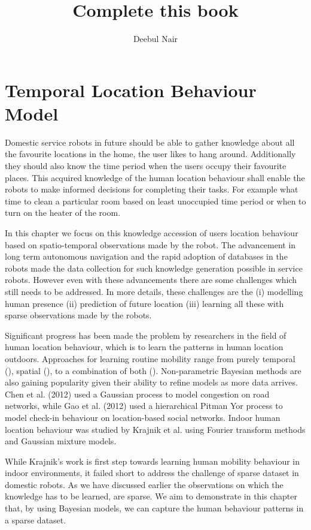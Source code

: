 \documentclass[12pt,parskip=half, DIV=calc, BCOR=10mm, x11names]{scrbook}
\title{\textbf{Complete this book }}
\author{Deebul Nair}
\date{}
\begin{document}
\chapter{Temporal Location Behaviour Model}

Domestic service robots in future should be able to gather knowledge about all the favourite locations in the home, the user likes to hang around. Additionally they should also know the time period when the users occupy their favourite places. This acquired knowledge of the human location behaviour shall enable the robots to make informed decisions for completing their tasks. For example what time to clean a particular room based  on least unoccupied time period or when to turn on the heater of the room. 

In this chapter we focus on this knowledge accession of users location behaviour based on spatio-temporal observations made by the robot. The advancement in long term autonomous navigation  and the rapid adoption of databases in the robots  made the data collection for such knowledge generation possible in service robots. However even with these advancements there are some challenges which still needs to be addressed.  In more details, these challenges are the (i) modelling human presence (ii) prediction of future location (iii) learning all these with sparse observations made by the robots. 

Significant progress has been made the problem by researchers in the field of human location behaviour, which is to learn the patterns in human location outdoors. Approaches for learning routine mobility  range from purely temporal (\cite{c1, c2}), spatial (\cite{c5,c3}), to a combination  of  both  (\cite{c4}). Non-parametric Bayesian methods are also gaining popularity given their ability to refine models as more data arrives. Chen et al. (2012) used a Gaussian process to model congestion on road networks, while Gao et al. (2012) used a hierarchical Pitman Yor process to model check-in behaviour on location-based social networks. Indoor human location behaviour was studied by Krajnik et al.  using Fourier transform methods and Gaussian mixture models. 

While Krajnik's  work is first step towards learning human mobility behaviour in indoor environments, it failed short to address the challenge of sparse dataset in domestic robots. As we have discussed earlier the observations on which the knowledge has to be learned, are sparse. We aim to demonstrate in this chapter that, by using Bayesian models, we can capture the human behaviour patterns in a sparse dataset.
\end{document}
